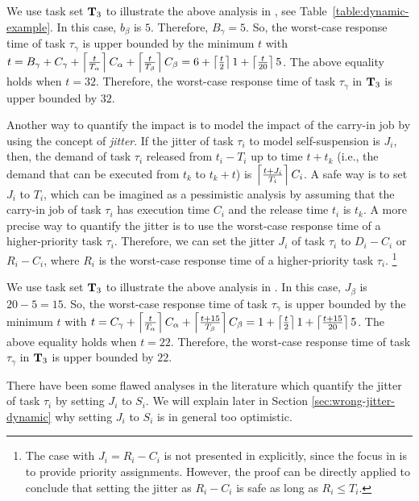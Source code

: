 \begin{table}[t]
\begin{table}[t]
\begin{itemize}
We use task set ${\bf T}_3$ to illustrate the above analysis in \cite[Page 164-165]{Liu:2000:RS:518501}, see Table~\ref{table:dynamic-example}. In this case, $b_\beta$ is $5$. Therefore, $B_\gamma = 5$. So, the worst-case response time of task $\tau_\gamma$ is upper bounded by the minimum $t$ with $t=B_\gamma+C_\gamma+\left\lceil{\frac{t}{T_\alpha}}\right\rceil C_\alpha +\left\lceil{\frac{t}{T_{\beta}}}\right\rceil C_\beta = 6+\left\lceil{\frac{t}{2}}\right\rceil 1 +\left\lceil{\frac{t}{20}}\right\rceil 5$. The above equality holds when $t=32$. Therefore, the worst-case response time of task $\tau_{\gamma}$ in ${\bf T}_3$ is upper bounded by $32$.
\vspace{0.1in}


Another way to quantify the impact is to model the impact of the carry-in job by using the concept of \emph{jitter}. If the jitter of task $\tau_i$ to model self-suspension is $J_i$, then, the demand of task $\tau_i$ released from $t_i-T_i$ up to time $t+t_k$  (i.e., the demand that can be executed from $t_k$ to $t_k+t$) is $\left\lceil{\frac{t+J_i}{T_i} }\right\rceil C_i$. A safe way is to set $J_i$ to $T_i$, which can be imagined as a pessimistic analysis by assuming that the carry-in job of task $\tau_i$ has execution time $C_i$ and the release time $t_i$ is $t_k$. A more precise way to quantify the jitter is to use the worst-case response time of a higher-priority task $\tau_i$. Therefore, we can set the jitter $J_i$ of task $\tau_i$ to $D_i-C_i$ \cite{huangpass:dac2015,Raj:suspension1991} or  $R_i-C_i$,
where $R_i$ is the worst-case response time of a higher-priority task $\tau_i$. \footnote{The case with $J_i = R_i-C_i$ is not presented in \cite{huangpass:dac2015} explicitly, since the focus in \cite{huangpass:dac2015} is to provide priority assignments. However, the proof can be directly applied to conclude that setting the jitter as $R_i-C_i$ is safe as long as $R_i \leq T_i$.}

We use task set ${\bf T}_3$ to illustrate the above analysis in \cite{huangpass:dac2015}. In this case, $J_\beta$ is $20-5=15$. So, the worst-case response time of task $\tau_\gamma$ is upper bounded by the minimum $t$ with $t=C_\gamma+\left\lceil{\frac{t}{T_\alpha}}\right\rceil C_\alpha +\left\lceil{\frac{t+15}{T_{\beta}}}\right\rceil C_\beta = 1+\left\lceil{\frac{t}{2}}\right\rceil 1 +\left\lceil{\frac{t+15}{20}}\right\rceil 5$. The above equality holds when $t=22$. Therefore, the worst-case response time of task $\tau_{\gamma}$ in ${\bf T}_3$ is upper bounded by $22$.


There have been some flawed analyses in the literature \cite{ECRTS-AudsleyB04,RTAS-AudsleyB04,RTCSA-KimCPKH95} which quantify the jitter of task $\tau_i$ by setting $J_i$ to $S_i$. We will explain later in Section \ref{sec:wrong-jitter-dynamic} why setting $J_i$ to $S_i$ is in general too optimistic. 


\end{itemize}
\end{table}
\end{table}
